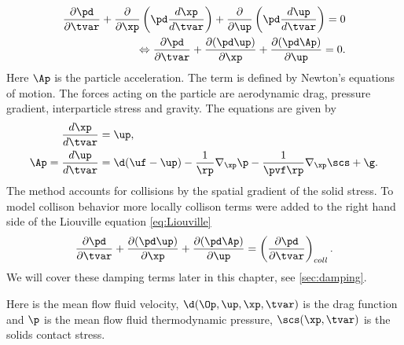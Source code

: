 \begin{align}
    \dfrac{\partial \pd}{\partial \tvar} + \dfrac{\partial}{\partial \xp} \left( \pd \dfrac{d \xp}{d \tvar} \right)+ \dfrac{\partial}{\partial \up} \left( \pd \dfrac{d \up}{d \tvar} \right) = 0 \\
    \label{eq:Liouville}
    \Leftrightarrow \dfrac{\partial \pd}{\partial \tvar} + \dfrac{\partial (\pd \up)}{\partial \xp} + \dfrac{\partial (\pd \Ap)}{\partial \up} = 0. %
\end{align}
Here $\Ap$ is the particle acceleration. The term is defined by Newton's equations of motion. The forces acting on the particle are aerodynamic drag, pressure gradient, interparticle stress and gravity.
The equations are given by
\begin{align}
    \dfrac{d \xp}{d \tvar} &= \up, \\
    \label{eq:accel}
    \Ap = \dfrac{d \up}{d \tvar} &=\d(\uf - \up) - \dfrac{1}{\rp} \nabla_{\xp} \p - \dfrac{1}{\pvf \rp} \nabla_{\xp} \scs + \g.
\end{align}
The \MP method accounts for collisions by the spatial gradient of the solid stress. 
To model collison behavior more locally collison terms were added to the right hand side of the Liouville equation \eqref{eq:Liouville} 
\begin{equation}
    \label{eq:LiouCollide}
    \dfrac{\partial \pd}{\partial \tvar} + \dfrac{\partial (\pd \up)}{\partial \xp} + \dfrac{\partial (\pd \Ap)}{\partial \up} = \left( \dfrac{\partial \pd}{\partial 
    \tvar} \right)_{coll}.
\end{equation}
We will cover these damping terms later in this chapter, see \ref{sec:damping}.

Here \uf is the mean flow fluid velocity, $\d(\Op,\up, \xp,\tvar)$ is the drag function and $\p$ is the mean flow fluid thermodynamic pressure, $\scs(\xp, \tvar)$ is the solids contact stress.

